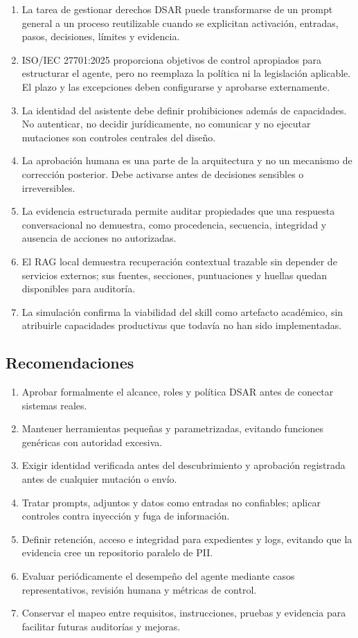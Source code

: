 \documentclass[11pt,a4paper]{article}
\begin{document}
\begin{enumerate}[label=\arabic*.]
  \item La tarea de gestionar derechos DSAR puede transformarse de un prompt general a un proceso reutilizable cuando se explicitan activación, entradas, pasos, decisiones, límites y evidencia.
  \item ISO/IEC 27701:2025 proporciona objetivos de control apropiados para estructurar el agente, pero no reemplaza la política ni la legislación aplicable. El plazo y las excepciones deben configurarse y aprobarse externamente.
  \item La identidad del asistente debe definir prohibiciones además de capacidades. No autenticar, no decidir jurídicamente, no comunicar y no ejecutar mutaciones son controles centrales del diseño.
  \item La aprobación humana es una parte de la arquitectura y no un mecanismo de corrección posterior. Debe activarse antes de decisiones sensibles o irreversibles.
  \item La evidencia estructurada permite auditar propiedades que una respuesta conversacional no demuestra, como procedencia, secuencia, integridad y ausencia de acciones no autorizadas.
  \item El RAG local demuestra recuperación contextual trazable sin depender de servicios externos; sus fuentes, secciones, puntuaciones y huellas quedan disponibles para auditoría.
  \item La simulación confirma la viabilidad del skill como artefacto académico, sin atribuirle capacidades productivas que todavía no han sido implementadas.
\end{enumerate}

\subsection{Recomendaciones}

\begin{enumerate}[label=\arabic*.]
  \item Aprobar formalmente el alcance, roles y política DSAR antes de conectar sistemas reales.
  \item Mantener herramientas pequeñas y parametrizadas, evitando funciones genéricas con autoridad excesiva.
  \item Exigir identidad verificada antes del descubrimiento y aprobación registrada antes de cualquier mutación o envío.
  \item Tratar prompts, adjuntos y datos como entradas no confiables; aplicar controles contra inyección y fuga de información.
  \item Definir retención, acceso e integridad para expedientes y logs, evitando que la evidencia cree un repositorio paralelo de PII.
  \item Evaluar periódicamente el desempeño del agente mediante casos representativos, revisión humana y métricas de control.
  \item Conservar el mapeo entre requisitos, instrucciones, pruebas y evidencia para facilitar futuras auditorías y mejoras.
\end{enumerate}
\end{document}
